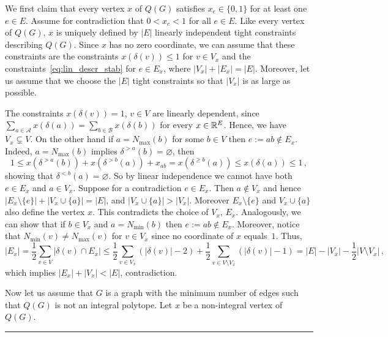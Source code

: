 \documentclass[3p,times]{elsarticle}
\newenvironment{proof}{{\bf Proof:  }}{\hfill\rule{2mm}{2mm}}
\begin{document}
\begin{proof}
  We first claim that every vertex $x$ of $Q(G)$ satisfies $x_e
  \in \{0,1\}$ for at least one $e \in E$. Assume for contradiction
  that $0 < x_e < 1$ for all $e \in E$. 
  Like every vertex of $Q(G)$, $x$ is uniquely defined by $|E|$ linearly independent tight constraints describing $Q(G)$. 
  Since $x$ has no zero coordinate, we can assume
  that these constraints are the constraints $x(\delta(v))\le 1$ for $v\in V_x$ 
  and the constraints~\eqref{eq:lin_descr_stab} for $e\in E_x$, where
  $|V_x|+|E_x|=|E|$. Moreover, let us assume that we choose the $|E|$
  tight constraints so that $|V_x|$ is as large as possible.

The constraints $x(\delta(v))=1$, $v\in V$ are linearly dependent, since $\sum_{a\in\mathcal{A}}x(\delta(a))=\sum_{b\in\mathcal{B}}x(\delta(b))$ for every $x \in \mathbb{R}^E$. Hence, we have $V_x\subsetneq V$. On the other hand if $a=N_{\max}(b)$ for some $b \in V$ then $e:=ab\not\in E_x$. Indeed, $a=N_{\max}(b)$ implies $\delta^{>a}(b)=\varnothing$, then
$$
	1\le x(\delta^{>a}(b))+ x(\delta^{>b}(a)) + x_{ab}=x(\delta^{\ge b}(a)) \le x(\delta(a)) \le 1\,,
$$
showing that $\delta^{< b}(a)=\varnothing$. So by linear independence we cannot have both $e \in E_x$ and $a \in V_x$. Suppose for a contradiction $e \in E_x$. Then $a \not\in V_x$ and hence $|E_x \setminus \{e\}| + |V_x \cup \{a\}| = |E|$, and $|V_x \cup \{a\}| > |V_x|$. Moreover $E_x\setminus \{e\}$ and $V_x\cup \{a\}$ also define the vertex $x$. This contradicts the choice of $V_x$, $E_x$. Analogously, we can show that if $b\in V_x$  and $a=N_{\min}(b)$ then $e:=ab\not\in E_x$. Moreover, notice that $N_{\min}(v)\neq N_{\max}(v)$ for $v\in V_x$ since no coordinate of $x$ equals~$1$. Thus, 
\[
	|E_x|=\frac{1}{2}\sum_{v\in V} |\delta(v)\cap E_x|\le \frac{1}{2}\sum_{v\in V_x} (|\delta(v)|-2)+\frac{1}{2}\sum_{v\in V\setminus V_x} (|\delta(v)|-1)= |E|-|V_x|-\frac{1}{2}|V\setminus V_x|\,,
\]
which implies $|E_x|+|V_x|< |E|$, contradiction.

\bigskip

Now let us assume that $G$ is a graph with the minimum number of edges such that $Q(G)$ is not an integral polytope. Let $x$ be a non-integral vertex of $Q(G)$.


\end{proof}
\end{document}
